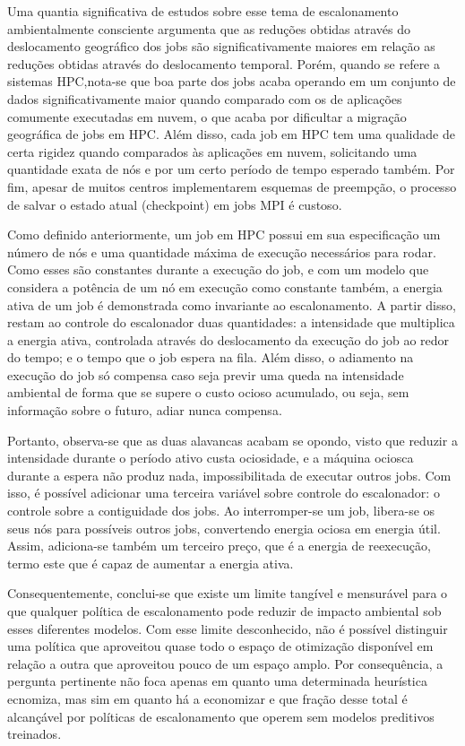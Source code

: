 Uma quantia significativa de estudos sobre esse tema de escalonamento ambientalmente consciente 
argumenta que as reduções obtidas através do deslocamento geográfico dos jobs são significativamente
maiores em relação as reduções obtidas através do deslocamento temporal. Porém, quando se refere a sistemas 
HPC,nota-se que boa parte dos jobs acaba operando em um conjunto de dados significativamente maior quando
comparado com os de aplicações comumente executadas em nuvem, o que acaba por dificultar a migração
geográfica de jobs em HPC. Além disso, cada job em HPC tem uma qualidade de certa rigidez quando comparados às
aplicações em nuvem, solicitando uma quantidade exata de nós e por um certo período de tempo esperado também. Por fim,
apesar de muitos centros implementarem esquemas de preempção, o processo de salvar o estado atual (checkpoint) em jobs
MPI é custoso.

Como definido anteriormente, um job em HPC possui em sua especificação um número de nós e uma quantidade
máxima de execução necessários para rodar. Como esses são constantes durante a execução do job, e com
um modelo que considera a potência de um nó em execução como constante também, a energia ativa de um job
é demonstrada como invariante ao escalonamento. A partir disso, restam ao controle do escalonador duas
quantidades: a intensidade que multiplica a energia ativa, controlada através do deslocamento da execução do job
ao redor do tempo; e o tempo que o job espera na fila. Além disso, o adiamento na execução do job só compensa
caso seja previr uma queda na intensidade ambiental de forma que se supere o custo ocioso acumulado, ou seja,
sem informação sobre o futuro, adiar nunca compensa.

Portanto, observa-se que as duas alavancas acabam se opondo, visto que reduzir a intensidade durante 
o período ativo custa ociosidade, e a máquina ociosca durante a espera não produz nada, impossibilitada
de executar outros jobs. Com isso, é possível adicionar uma terceira variável sobre controle do escalonador:
o controle sobre a contiguidade dos jobs. Ao interromper-se um job, libera-se os seus nós para possíveis outros jobs,
convertendo energia ociosa em energia útil. Assim, adiciona-se também um terceiro preço, que é a energia de 
reexecução, termo este que é capaz de aumentar a energia ativa.

Consequentemente, conclui-se que existe um limite tangível e mensurável para o que qualquer política 
de escalonamento pode reduzir de impacto ambiental sob esses diferentes modelos. Com esse limite desconhecido,
não é possível distinguir uma política que aproveitou quase todo o espaço de otimização disponível
em relação a outra que aproveitou pouco de um espaço amplo. Por consequência, a pergunta pertinente não foca
apenas em quanto uma determinada heurística ecnomiza, mas sim em quanto há a economizar e que fração desse total
é alcançável por políticas de escalonamento que operem sem modelos preditivos treinados. 

